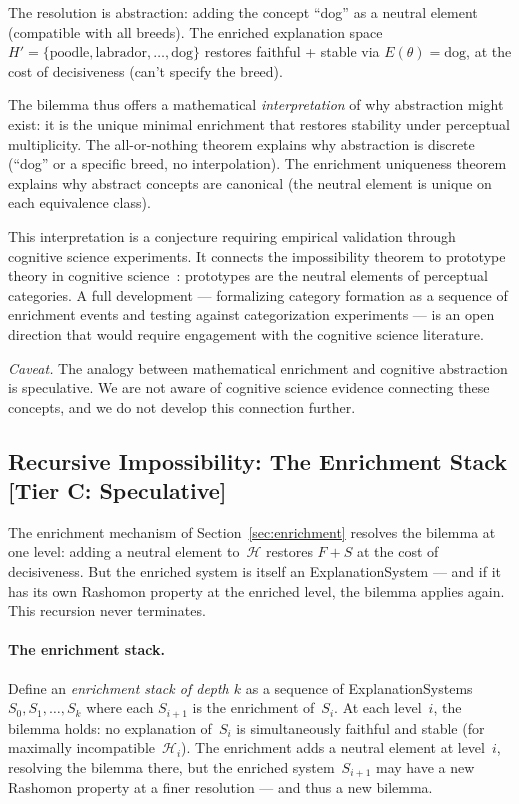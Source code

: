 \documentclass[11pt,a4paper]{article}
\newcommand{\sH}{\mathcal{H}}
\begin{document}
The resolution is abstraction: adding the concept ``dog'' as a neutral
element (compatible with all breeds).  The enriched explanation space
$H' = \{\text{poodle}, \text{labrador}, \ldots, \text{dog}\}$ restores
faithful + stable via $E(\theta) = \text{dog}$, at the cost of
decisiveness (can't specify the breed).

The bilemma thus offers a mathematical \emph{interpretation} of why
abstraction might exist: it is the unique minimal enrichment that
restores stability under perceptual multiplicity.  The all-or-nothing theorem
explains why abstraction is discrete (``dog'' or a specific breed, no
interpolation).  The enrichment uniqueness theorem explains why abstract
concepts are canonical (the neutral element is unique on each
equivalence class).

This interpretation is a conjecture requiring empirical validation through cognitive science experiments.  It connects the impossibility theorem to prototype
theory in cognitive science~\citep{rosch1975cognitive}: prototypes are
the neutral elements of perceptual categories.  A full development ---
formalizing category formation as a sequence of enrichment events and
testing against categorization experiments --- is an open direction that
would require engagement with the cognitive science literature.

\smallskip\noindent\emph{Caveat.} The analogy between mathematical enrichment and cognitive abstraction is speculative. We are not aware of cognitive science evidence connecting these concepts, and we do not develop this connection further.

\subsection{Recursive Impossibility: The Enrichment Stack\,\textnormal{\normalsize[Tier C: Speculative]}}
\label{sec:recursive}

The enrichment mechanism of Section~\ref{sec:enrichment} resolves the bilemma at one level: adding a neutral element to~$\sH$ restores $F+S$ at the cost of decisiveness. But the enriched system is itself an ExplanationSystem --- and if it has its own Rashomon property at the enriched level, the bilemma applies again. This recursion never terminates.

\paragraph{The enrichment stack.}
Define an \emph{enrichment stack of depth $k$} as a sequence of ExplanationSystems $S_0, S_1, \ldots, S_k$ where each $S_{i+1}$ is the enrichment of~$S_i$. At each level~$i$, the bilemma holds: no explanation of~$S_i$ is simultaneously faithful and stable (for maximally incompatible~$\sH_i$). The enrichment adds a neutral element at level~$i$, resolving the bilemma there, but the enriched system~$S_{i+1}$ may have a new Rashomon property at a finer resolution --- and thus a new bilemma.
\end{document}
